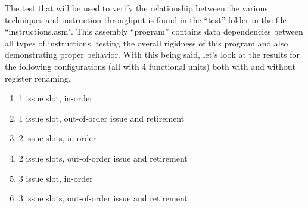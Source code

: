 \documentclass{article}
\begin{document}
The test that will be used to verify the relationship between the various techniques and instruction throughput is found in the ``test'' folder in the file ``instructions.asm''. This assembly ``program'' contains data dependencies between all types of instructions, testing the overall rigidness of this program and also demonstrating proper behavior. With this being said, let's look at the results for the following configurations (all with 4 functional units) both with and without register renaming.

\begin{enumerate}
    \item 1 issue slot, in-order 
    \item 1 issue slot, out-of-order issue and retirement 
    \item 2 issue slots, in-order 
    \item 2 issue slots, out-of-order issue and retirement 
    \item 3 issue slot, in-order 
    \item 3 issue slots, out-of-order issue and retirement 
\end{enumerate}
\end{document}
